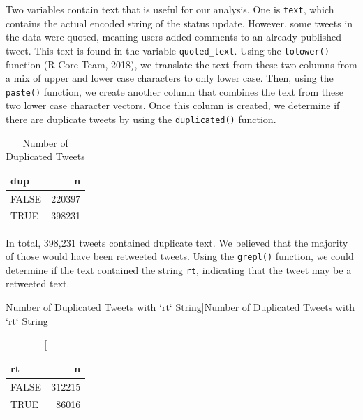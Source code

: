 \documentclass[12pt,twoside]{reedthesis}
\newenvironment{Shaded}{\begin{snugshade}}{\end{snugshade}}
\newcommand{\KeywordTok}[1]{\textcolor[rgb]{0.13,0.29,0.53}{\textbf{#1}}}
\newcommand{\DataTypeTok}[1]{\textcolor[rgb]{0.13,0.29,0.53}{#1}}
\newcommand{\StringTok}[1]{\textcolor[rgb]{0.31,0.60,0.02}{#1}}
\newcommand{\CommentTok}[1]{\textcolor[rgb]{0.56,0.35,0.01}{\textit{#1}}}
\newcommand{\OtherTok}[1]{\textcolor[rgb]{0.56,0.35,0.01}{#1}}
\newcommand{\OperatorTok}[1]{\textcolor[rgb]{0.81,0.36,0.00}{\textbf{#1}}}
\newcommand{\NormalTok}[1]{#1}
\begin{document}
Two variables contain text that is useful for our analysis. One is
\texttt{text}, which contains the actual encoded string of the status
update. However, some tweets in the data were quoted, meaning users
added comments to an already published tweet. This text is found in the
variable \texttt{quoted\_text}. Using the \texttt{tolower()} function (R
Core Team, 2018), we translate the text from these two columns from a
mix of upper and lower case characters to only lower case. Then, using
the \texttt{paste()} function, we create another column that combines
the text from these two lower case character vectors. Once this column
is created, we determine if there are duplicate tweets by using the
\texttt{duplicated()} function.

\small
\begin{table}[!h]

\caption[Number of Duplicated Tweets]{\label{tab:unnamed-chunk-6}Number of Duplicated Tweets}
\centering
\begin{tabular}{l|r}
\hline
dup & n\\
\hline
FALSE & 220397\\
\hline
TRUE & 398231\\
\hline
\end{tabular}
\end{table}
\normalsize
In total, 398,231 tweets contained duplicate text. We believed that the
majority of those would have been retweeted tweets. Using the
\texttt{grepl()} function, we could determine if the text contained the
string \texttt{rt}, indicating that the tweet may be a retweeted text.
\begin{Shaded}
\end{Shaded}
\begin{table}[!h]

\caption[Number of Duplicated Tweets with `rt` String]{\label{tab:rttweets}Number of Duplicated Tweets with `rt` String}
\centering
\begin{tabular}{l|r}
\hline
rt & n\\
\hline
FALSE & 312215\\
\hline
TRUE & 86016\\
\hline
\end{tabular}
\end{table}
\end{document}
